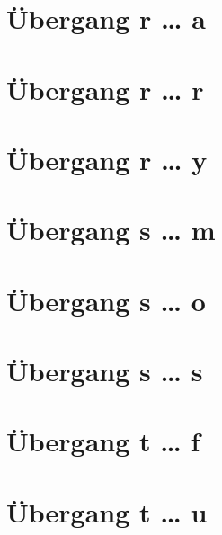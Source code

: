 \documentclass[a4paper,landscape]{article}
\begin{document}
\hspace*{-1ex}
\newpage

\section{Übergang r … a }

\hspace*{-1ex}
\newpage

\section{Übergang r … r }

\hspace*{-1ex}
\newpage

\section{Übergang r … y }

\hspace*{-1ex}
\newpage

\section{Übergang s … m }

\hspace*{-1ex}
\newpage

\section{Übergang s … o }

\hspace*{-1ex}
\newpage

\section{Übergang s … s }

\hspace*{-1ex}
\newpage

\section{Übergang t … f }

\hspace*{-1ex}
\newpage

\section{Übergang t … u }
\end{document}
